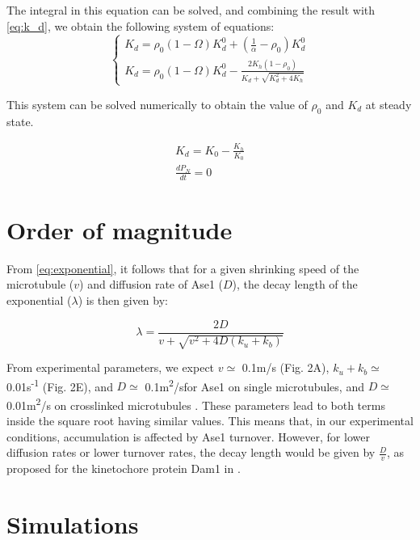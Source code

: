 \documentclass{article}
\newcommand{\ums}{\textmu m/s}
\newcommand{\umsqs}{\textmu m\textsuperscript{2}/s}
\begin{document}
The integral in this equation can be solved, and combining the result with \autoref{eq:k_d}, we obtain the following system of equations:
\begin{equation}
\begin{cases}
K_d = \rho_0(1-\Omega)K_d^0 + (\frac{1}{\alpha}-\rho_0)K_d^0\\
K_d = \rho_0(1-\Omega)K_d^0 - \frac{2K_h(1-\rho_0)}{K_d+\sqrt{K_d^2+4K_h}}
\end{cases}
\end{equation}

This system can be solved numerically to obtain the value of $\rho_0$ and $K_d$ at steady state.

\begin{gather}
\label{eq:solK_0}
K_d = K_0 - \frac{K_h}{K_0}\\ 
\label{eq:solP_0}
\frac{dP_N}{dt} = 0
\end{gather}









\section{Order of magnitude}

From \autoref{eq:exponential}, it follows that for a given shrinking speed of the microtubule ($v$) and diffusion rate of Ase1 ($D$), the decay length of the exponential ($\lambda$) is then given by:


\begin{equation}
\label{eq:decay_length}
\lambda = \frac{2D}{v+\sqrt{v^2 + 4D(k_u+k_b)}}
\end{equation}

From experimental parameters, we expect  $v\simeq$ 0.1\ums{} (Fig. 2A), $k_u+k_b\simeq$ 0.01s\textsuperscript{-1} (Fig. 2E), and $D\simeq$ 0.1\umsqs for Ase1 on single microtubules, and $D\simeq$ 0.01\umsqs{} on crosslinked microtubules \cite{Lansky2015}. These parameters lead to both terms inside the square root having similar values. This means that, in our experimental conditions, accumulation is affected by Ase1 turnover. However, for lower diffusion rates or lower turnover rates, the decay length would be given by $\frac{D}{v}$, as proposed for the kinetochore protein Dam1 in \cite{Gardner2008b}.

\section{Simulations}

\small


\end{document}
